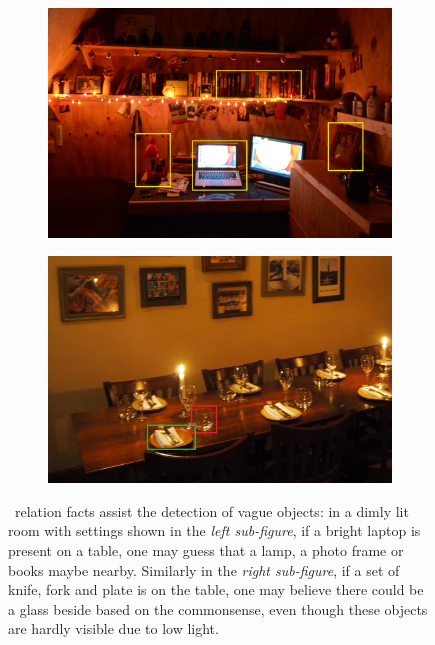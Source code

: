 \begin{figure}[bh]
	\centering
	\begin{subfigure}{.45\textwidth}
		\centering
		\includegraphics[width=0.95\columnwidth]{dim-room.jpg}
	\end{subfigure}
	\begin{subfigure}{.45\textwidth}
		\centering
		\includegraphics[width=0.95\columnwidth]{dim-table.jpg}
	\end{subfigure}
	\caption{\lnear~relation facts assist the detection of vague objects: in a dimly lit room with settings shown in the \textit{left sub-figure}, if a bright laptop is present on a table, one may guess that a lamp, a photo frame or books maybe nearby. Similarly in the \textit{right sub-figure}, if a set of knife, fork and plate is on the table, one may believe there could be a glass beside based on the commonsense, 
		even though these objects are hardly visible due to low light.}
	\label{fig:dim}
\end{figure}
